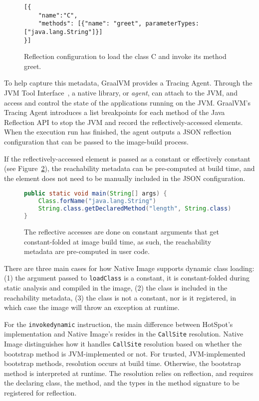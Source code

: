\begin{figure}[ht]
    \centering
\begin{lstlisting}
[{
    "name":"C",
    "methods": [{"name": "greet", parameterTypes: ["java.lang.String"]}]
}]    
\end{lstlisting}
    \caption{Reflection configuration to load the class C and invoke its method greet.}
    \label{fig:reflect_config}
\end{figure}

To help capture this metadata, GraalVM provides a Tracing Agent. Through the JVM Tool Interface~\cite{noauthor_jvmtm_nodate}, a native library, or \emph{agent}, can attach to the JVM, and access and control the state of the applications running on the JVM. GraalVM's Tracing Agent introduces a list breakpoints for each method of the Java Reflection API to stop the JVM and record the reflectively-accessed elements. When the execution run has finished, the agent outputs a JSON reflection configuration that can be passed to the image-build process.

If the reflectively-accessed element is passed as a constant or effectively constant (see Figure~\ref{fig:computing_reflection_metadata_in_code_code}), the reachability metadata can be pre-computed at build time, and the element does not need to be manually included in the JSON configuration. 

\begin{figure}[ht]
    \centering
\begin{lstlisting}[language=Java]
public static void main(String[] args) {
    Class.forName("java.lang.String")
    String.class.getDeclaredMethod("length", String.class)
}    
\end{lstlisting}
    \caption{The reflective accesses are done on constant arguments that get constant-folded at image build time, as such, the reachability metadata are pre-computed in user code.}
    \label{fig:computing_reflection_metadata_in_code_code}
\end{figure}

There are three main cases for how Native Image supports dynamic class loading: (1) the argument passed to \verb|loadClass| is a constant, it is constant-folded during static analysis and compiled in the image, (2) the class is included in the reachability metadata, (3) the class is not a constant, nor is it registered, in which case the image will throw an exception at runtime.

For the \verb|invokedynamic| instruction, the main difference between HotSpot's implementation and Native Image's resides in the \verb|CallSite| resolution. Native Image distinguishes how it handles \verb|CallSite| resolution based on whether the bootstrap method is JVM-implemented or not. For trusted, JVM-implemented bootstrap methods, resolution occurs at build time. Otherwise, the bootstrap method is interpreted at runtime. The resolution relies on reflection, and requires the declaring class, the method, and the types in the method signature to be registered for reflection.